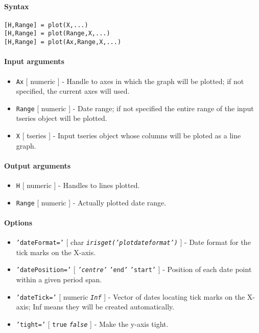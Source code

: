 


	\paragraph{Syntax}

\begin{verbatim}
[H,Range] = plot(X,...)
[H,Range] = plot(Range,X,...)
[H,Range] = plot(Ax,Range,X,...)
\end{verbatim}

\paragraph{Input arguments}

\begin{itemize}
\item
  \texttt{Ax} {[} numeric {]} - Handle to axes in which the graph will
  be plotted; if not specified, the current axes will used.
\item
  \texttt{Range} {[} numeric {]} - Date range; if not specified the
  entire range of the input tseries object will be plotted.
\item
  \texttt{X} {[} tseries {]} - Input tseries object whose columns will
  be ploted as a line graph.
\end{itemize}

\paragraph{Output arguments}

\begin{itemize}
\item
  \texttt{H} {[} numeric {]} - Handles to lines plotted.
\item
  \texttt{Range} {[} numeric {]} - Actually plotted date range.
\end{itemize}

\paragraph{Options}

\begin{itemize}
\item
  \texttt{'dateFormat='} {[} char \textbar{}
  \emph{\texttt{irisget('plotdateformat')}} {]} - Date format for the
  tick marks on the X-axis.
\item
  \texttt{'datePosition='} {[} \emph{\texttt{'centre'}} \textbar{}
  \texttt{'end'} \textbar{} \texttt{'start'} {]} - Position of each date
  point within a given period span.
\item
  \texttt{'dateTick='} {[} numeric \textbar{} \emph{\texttt{Inf}} {]} -
  Vector of dates locating tick marks on the X-axis; Inf means they will
  be created automatically.
\item
  \texttt{'tight='} {[} \texttt{true} \textbar{} \emph{\texttt{false}}
  {]} - Make the y-axis tight.
\end{itemize}

